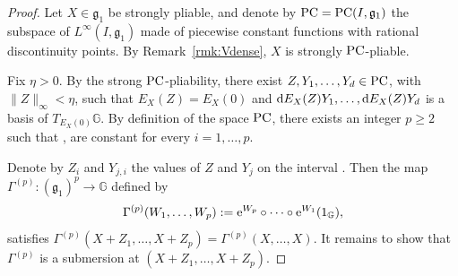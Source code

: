 \documentclass[pdftex]{sigma}
\numberwithin{equation}{section}
\theoremstyle{definition}
\begin{document}
\begin{proof}
Let $X\in{\mathfrak g}_1$ be strongly pliable, and denote by ${\rm PC}={\rm PC}(I,{\mathfrak g}_1)$ the subspace of $L^\infty(I,{\mathfrak g}_1)$ made of piecewise constant functions with rational discontinuity points. By Remark~\ref{rmk:Vdense}, $X$ is strongly ${\rm PC}$-pliable.


 Fix $\eta>0$. By the strong ${\rm PC}$-pliability, there exist $Z,Y_1,\dots,Y_d\in {\rm PC}$, with $\|Z\|_\infty<\eta$, such that $E_X(Z) = E_X(0)$ and ${\rm d}E_X(Z)Y_1,\dots,{\rm d}E_X(Z)Y_d$ is a basis of $T_{E_X(0)}\mathbb{G}$. By definition of the space ${\rm PC}$, there exists an integer $p\ge 2$ such that ,  are constant for every $i=1,\dots,p$.

 Denote by $Z_i$ and $Y_{j,i}$ the values of $Z$ and $Y_j$ on the interval . Then the map $\Gamma^{(p)}\colon ({\mathfrak g}_1)^p\to\mathbb{G}$ defined by
 \[
 \Gamma^{(p)}(W_1,\dots,W_p):= {\rm e}^{{W_{p}}}\circ \dots \circ {\rm e}^{{W_{1}}}(1_\mathbb{G}),
 \]
satisfies $\Gamma^{(p)} (X+Z_1,\dots,X+Z_p) = \Gamma^{(p)} (X, \dots, X)$.
 It remains to show
that $\Gamma^{(p)}$ is a submersion at $(X+Z_1,\dots,X+Z_p)$.


\end{proof}
\end{document}
